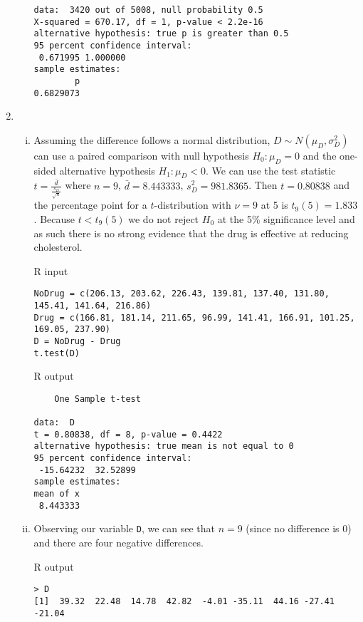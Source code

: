 \documentclass[10pt]{article}
\begin{document}
\begin{enumerate}
\begin{enumerate}[(i)]
\begin{verbatim}
data:  3420 out of 5008, null probability 0.5
X-squared = 670.17, df = 1, p-value < 2.2e-16
alternative hypothesis: true p is greater than 0.5
95 percent confidence interval:
 0.671995 1.000000
sample estimates:
        p 
0.6829073 
                    \end{verbatim}
            \end{enumerate}
        \item
            \begin{enumerate}[(i)]
                \item Assuming the difference follows a normal distribution, $D
                    \sim N(\mu_D, \sigma^2_D)$ can use a paired comparison with
                    null hypothesis $H_0: \mu_D = 0$ and the one-sided
                    alternative hypothesis $H_1 : \mu_D < 0$. We can use the
                    test statistic $t = \frac{\bar{d}}{\frac{s_D}{\sqrt{n}}}$
                    where $n = 9$, $\bar{d} = 8.443333$, $s^2_D = 981.8365$. Then
                    $t = 0.80838$ and the percentage point for a
                    $t$-distribution with $\nu = 9$ at 5 is $t_9(5) = 1.833$.
                    Because $t < t_9(5)$ we do not reject $H_0$ at the 5\%
                    significance level and as such there is no strong evidence
                    that the drug is effective at reducing cholesterol.

                    R input
                    \begin{verbatim}
NoDrug = c(206.13, 203.62, 226.43, 139.81, 137.40, 131.80, 145.41, 141.64, 216.86)
Drug = c(166.81, 181.14, 211.65, 96.99, 141.41, 166.91, 101.25, 169.05, 237.90)
D = NoDrug - Drug
t.test(D)
                    \end{verbatim}

                    R output
                    \begin{verbatim}
	One Sample t-test

data:  D
t = 0.80838, df = 8, p-value = 0.4422
alternative hypothesis: true mean is not equal to 0
95 percent confidence interval:
 -15.64232  32.52899
sample estimates:
mean of x 
 8.443333 
                    \end{verbatim}
                \item Observing our variable \texttt{D}, we can see
                    that $n = 9$ (since no difference is 0) and there are four
                    negative differences.

                    R output
                    \begin{verbatim}
> D
[1]  39.32  22.48  14.78  42.82  -4.01 -35.11  44.16 -27.41 -21.04
                    \end{verbatim}


\end{enumerate}
\end{enumerate}
\end{document}
